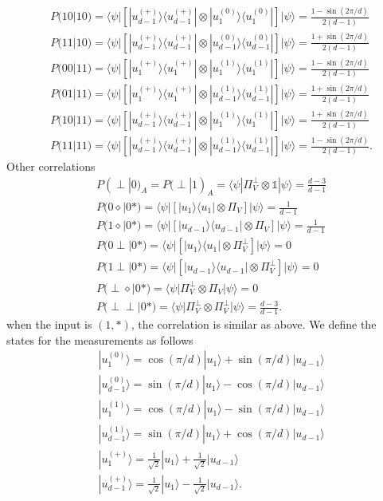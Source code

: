 \documentclass[11pt,letterpaper]{article}
\newcommand{\ket}[1]{|#1\rangle}
\newcommand{\bra}[1]{\langle#1|}
\newcommand{\ketbra}[2]{|#1\rangle\langle#2|}
\newcommand{\1}{\mathbb{1}}
\theoremstyle{definition}
\begin{document}
\begin{align}
	&P(10|10) = \bra{\psi}  \left[\ketbra{u_{d-1}^{(+)}}{u_{d-1}^{(+)}}\otimes \ketbra{u_1^{(0)}}{u_1^{(0)}}\right]\ket{\psi} = \frac{1-\sin(2\pi/d)}{2(d-1)}\\
	&P(11|10) = \bra{\psi}  \left[\ketbra{u_{d-1}^{(+)}}{u_{d-1}^{(+)}}\otimes \ketbra{u_{d-1}^{(0)}}{u_{d-1}^{(0)}}\right]\ket{\psi} = \frac{1+\sin(2\pi/d)}{2(d-1)}\\
	&P(00|11) = \bra{\psi}  \left[\ketbra{u_1^{(+)}}{u_1^{(+)}}\otimes \ketbra{u_1^{(1)}}{u_1^{(1)}}\right]\ket{\psi} = \frac{1-\sin(2\pi/d)}{2(d-1)}\\
	&P(01|11) = \bra{\psi}  \left[\ketbra{u_1^{(+)}}{u_1^{(+)}}\otimes \ketbra{u_{d-1}^{(1)}}{u_{d-1}^{(1)}}\right]\ket{\psi} = \frac{1+\sin(2\pi/d)}{2(d-1)}\\
	&P(10|11) = \bra{\psi}  \left[\ketbra{u_{d-1}^{(+)}}{u_{d-1}^{(+)}}\otimes \ketbra{u_1^{(1)}}{u_1^{(1)}}\right]\ket{\psi} = \frac{1+\sin(2\pi/d)}{2(d-1)}\\
	&P(11|11) = \bra{\psi}  \left[\ketbra{u_{d-1}^{(+)}}{u_{d-1}^{(+)}}\otimes \ketbra{u_{d-1}^{(1)}}{u_{d-1}^{(1)}}\right]\ket{\psi} = \frac{1-\sin(2\pi/d)}{2(d-1)}.
\end{align}
Other correlations
\begin{align}
	&P(\perp|0)_A = P(\perp|1)_A = \bra{\psi} \Pi_V^\perp \otimes \1\ket{\psi} = \frac{d-3}{d-1}\\
	&P(0\diamond|0\ast) = \bra{\psi}\left[\ketbra{u_1}{u_1}\otimes\Pi_V\right]\ket{\psi} = \frac{1}{d-1}\\
	&P(1\diamond|0\ast)= \bra{\psi}\left[\ketbra{u_{d-1}}{u_{d-1}}\otimes\Pi_V\right]\ket{\psi} = \frac{1}{d-1}\\
	&P(0\perp|0\ast) = \bra{\psi}\left[\ketbra{u_{1}}{u_{1}}\otimes\Pi_V^\perp\right]\ket{\psi} = 0\\
	&P(1\perp|0\ast)= \bra{\psi}\left[\ketbra{u_{d-1}}{u_{d-1}}\otimes\Pi_V^\perp\right]\ket{\psi} = 0\\
	&P(\perp \diamond | 0 \ast) = \bra{\psi} \Pi_V^\perp \otimes \Pi_V \ket{\psi} = 0\\
	&P(\perp \perp | 0 \ast) =  \bra{\psi} \Pi_V^\perp \otimes \Pi_V^\perp \ket{\psi} = \frac{d-3}{d-1}.
\end{align}
when the input is $(1, \ast)$, the correlation is similar as above.
We define the states for the measurements as follows
\begin{align}
	&\ket{u_1^{(0)}} = \cos(\pi/d)\ket{u_1} + \sin(\pi/d)\ket{u_{d-1}}\\
	&\ket{u_{d-1}^{(0)}} = \sin(\pi/d)\ket{u_1} - \cos(\pi/d)\ket{u_{d-1}}\\
	&\ket{u_1^{(1)}} = \cos(\pi/d)\ket{u_1} - \sin(\pi/d)\ket{u_{d-1}}\\
	&\ket{u_{d-1}^{(1)}} = \sin(\pi/d)\ket{u_1} + \cos(\pi/d)\ket{u_{d-1}}\\
	&\ket{u_1^{(+)}} = \frac{1}{\sqrt{2}}\ket{u_1} + \frac{1}{\sqrt{2}}\ket{u_{d-1}}\\
	&\ket{u_{d-1}^{(+)}} = \frac{1}{\sqrt{2}}\ket{u_1} - \frac{1}{\sqrt{2}}\ket{u_{d-1}}.
\end{align}
\end{document}
